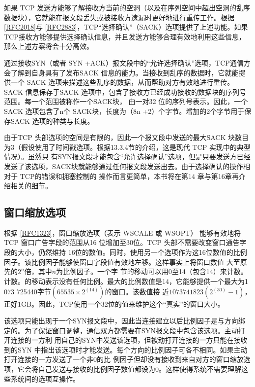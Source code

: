 如果 TCP
发送方能够了解接收方当前的空洞（以及在序列空间中超出空洞的乱序数据块），它就能在报文段丢失或被接收方遗漏时更好地进行重传工作。根据\href{https://www.rfc-editor.org/rfc/rfc2018}{[RFC2018]}与
\href{https://www.rfc-editor.org/rfc/rfc2883}{[RFC2883]}，TCP“选择确认”（SACK）选项提供了上述功能。如果
TCP接收方能够提供选择确认信息，并且发送方能够合理有效地利用这些信息，那么上述方案将会十分高效。

通过接收SYN（或者 SYN +ACK）报文段中的“允许选择确认”选项，TCP通信方会了解到自身具有了发布SACK
信息的能力。当接收到乱序的数据时，它就能提供一个 SACK
选项来描述这些乱序的数据，从而帮助对方有效地进行重传。SACK 信息保存于SACK
选项中，包含了接收方已经成功接收的数据块的序列号范围。每一个范围被称作一个SACK块，
由一对32 位的序列号表示。因此，一个 SACK 选项包含了n个 SACK块，长度为（8n +2）个字节。增加的2个字节用于保存SACK 选项的种类与长度。

由于TCP 头部选项的空间是有限的，因此一个报文段中发送的最大SACK
块数目为3（假设使用了时间戳选项。根据13.3.4节的介绍，这是现代 TCP 实现中的典型情况）。虽然只
有SYN报文段才能包含“允许选择确认”选项，但是只要发送方已经发送了该选项，SACK块就能够通过任何报文段发送出去。由于选择确认的操作相对于
TCP的错误和拥塞控制的
操作而言更简单，本书将在第14 章与第16章再介绍相关的细节。
\subsection{窗口缩放选项}
根据 \href{https://www.rfc-editor.org/rfc/rfc1323}{[RFC1323]}，窗口缩放选项（表示
WSCALE 或 WSOPT） 能够有效地将 TCP 窗口广告字段的范围从16 位增加至30位。TCP 头部不需要改变窗口通告字段的大小，仍然维持
16位的数值。同时，使用另一个选项作为这16位数值的比例因子。该比例因子能够使窗口字段值有效地左移。这样事实上将窗口数值
大至原先的$2^n$倍，其中$n$为比例因子。一个字
节的移动可以用0至14（包含14）来计数。计数。的移动表示没有任何比例。最大的比例数值是14，它能够提供一个最大为1 073
725440字节$(65535 ×2^(14))$的窗口。该数值接
近$1073 741 823(2^(30)-1)$，正好1GB。因此，TCP使用一个32位的值来维护这个“真实”的窗口大小。

该选项只能出现于一个SYN报文段中，因此当连接建立以后比例因子是与方向绑定的。为了保证窗口调整，通信双方都需要在SYN报文段中包含该选项。主动打开连接的一方利
用自己的SYN中发送该选项，但被动打开连接的一方只能在接收到的SYN
中指出该选项时才能发送。每个方向的比例因子可各不相同。如果主动打开连接的一方发送了一个非0的比
例因子但却没有接收到来自对方的窗口缩放选项，它会将自己发送与接收的比例因子数值都设为0。这样使得系统不需要理解这些系统间的选项互操作。

